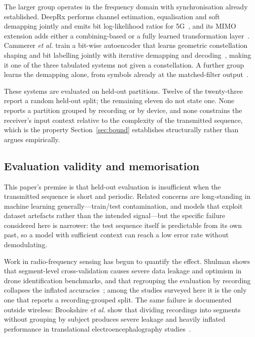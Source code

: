 \documentclass[journal]{IEEEtran}   %
\begin{document}
The larger group operates in the frequency domain with synchronisation already
established. DeepRx performs channel estimation, equalisation and soft demapping
jointly and emits bit log-likelihood ratios for
5G~\cite{honkala2021deeprxfullyconvolutionaldeep}, and its MIMO extension adds
either a combining-based or a fully learned transformation
layer~\cite{korpi2021UplinkCNN}. Cammerer \textit{et al.} train a bit-wise
autoencoder that learns geometric constellation shaping and bit labelling
jointly with iterative demapping and decoding~\cite{cammerer2020trainableCS},
making it one of the three tabulated systems not given a constellation. A
further group learns the demapping alone, from symbols already at the
matched-filter output~\cite{Zheng2022DemodNet, alwin2024LLRSymNet,
ganse2024MLApprochDemapping, polvani2021MIMO}.

These systems are evaluated on held-out partitions. Twelve of the twenty-three
report a random held-out split; the remaining eleven do not state one. None
reports a partition grouped by recording or by device, and none constrains the
receiver's input context relative to the complexity of the transmitted sequence,
which is the property Section~\ref{sec:bound} establishes structurally rather
than argues empirically.

\subsection{Evaluation validity and memorisation}
This paper's premise is that held-out evaluation is insufficient when the
transmitted sequence is short and periodic. Related concerns are long-standing
in machine learning generally---train/test contamination, and models that
exploit dataset artefacts rather than the intended signal---but the specific
failure considered here is narrower: the test sequence itself is predictable
from its own past, so a model with sufficient context can reach a low error rate
without demodulating.

Work in radio-frequency sensing has begun to quantify the effect. Shulman
shows that segment-level cross-validation causes severe data leakage and
optimism in drone identification benchmarks, and that regrouping the evaluation
by recording collapses the inflated
accuracies~\cite{shulman2026rfdronebenchmarksoverstate}; among the studies
surveyed here it is the only one that reports a recording-grouped split. The
same failure is documented outside wireless: Brookshire \textit{et al.} show
that dividing recordings into segments without grouping by subject produces
severe leakage and heavily inflated performance in translational
electroencephalography studies~\cite{brook2024dataLeakage}.
\end{document}
